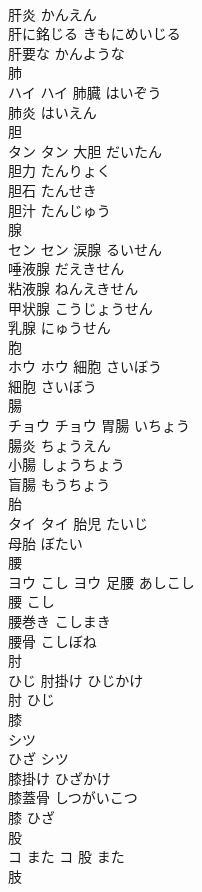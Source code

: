 \documentclass[8pt]{extreport}
\begin{document}
\begin{CJK}{UTF8}{min}
\\	肝炎	かんえん	
\\	肝に銘じる	きもにめいじる	
\\	肝要な	かんような	
\\	肺	
\\	ハイ		ハイ	肺臓	はいぞう	
\\	肺炎	はいえん	
\\	胆	
\\	タン		タン	大胆	だいたん	
\\	胆力	たんりょく	
\\	胆石	たんせき	
\\	胆汁	たんじゅう	
\\	腺	
\\	セン		セン	涙腺	るいせん	
\\	唾液腺	だえきせん	
\\	粘液腺	ねんえきせん	
\\	甲状腺	こうじょうせん	
\\	乳腺	にゅうせん	
\\	胞	
\\	ホウ		ホウ	細胞	さいぼう	
\\	細胞	さいぼう	
\\	腸	
\\	チョウ		チョウ	胃腸	いちょう	
\\	腸炎	ちょうえん	
\\	小腸	しょうちょう	
\\	盲腸	もうちょう	
\\	胎	
\\	タイ		タイ	胎児	たいじ	
\\	母胎	ぼたい	
\\	腰	
\\	ヨウ	こし	ヨウ													足腰	あしこし	
\\	腰	こし	
\\	腰巻き	こしまき	
\\	腰骨	こしぼね	
\\	肘	
\\	ひじ		肘掛け	ひじかけ	
\\	肘	ひじ	
\\	膝	
\\	シツ
\\	ひざ	シツ
\\	膝掛け	ひざかけ	
\\	膝蓋骨	しつがいこつ	
\\	膝	ひざ	
\\	股	
\\	コ	また	コ													股	また	
\\	肢	

\end{CJK}
\end{document}
